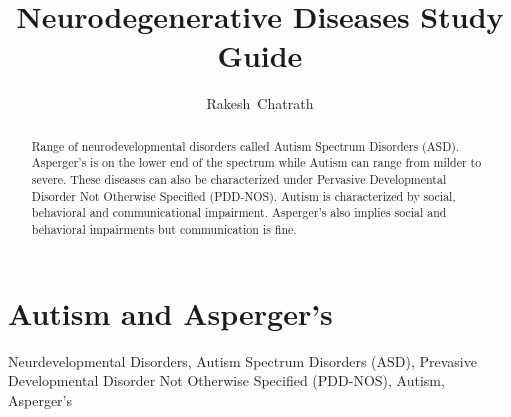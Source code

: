 \documentclass[journal, 12pt]{IEEEtran}
\begin{document}
\title{Neurodegenerative Diseases Study Guide}
\author{Rakesh~Chatrath}
\maketitle
\section{Autism and Asperger's}
\begin{abstract}
Range of neurodevelopmental disorders called Autism Spectrum Disorders (ASD). Asperger's is on the lower end of the spectrum while Autism can range from milder to severe. These diseases can also be characterized under Pervasive Developmental Disorder Not Otherwise Specified (PDD-NOS). Autism is characterized by social, behavioral and communicational impairment. Asperger's also implies social and behavioral impairments but communication is fine. 
\end{abstract}
\begin{IEEEkeywords}
Neurdevelopmental Disorders, Autism Spectrum Disorders (ASD), Prevasive Developmental Disorder Not Otherwise Specified (PDD-NOS), Autism, Asperger's 
\end{IEEEkeywords} 
\end{document}

